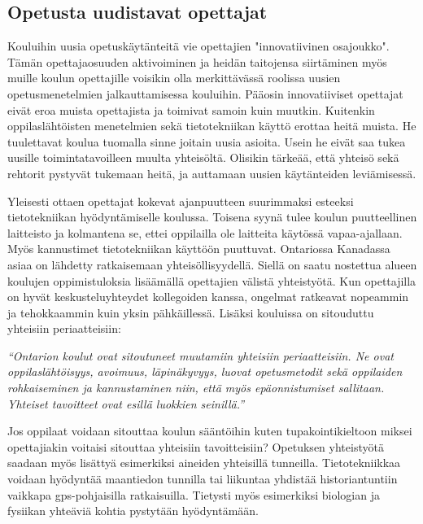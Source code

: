 \documentclass[utf8,bachelor]{gradu3}
\begin{document}
\subsection{Opetusta uudistavat opettajat}
Kouluihin uusia opetuskäytänteitä vie opettajien "innovatiivinen osajoukko". Tämän opettajaosuuden aktivoiminen ja heidän taitojensa siirtäminen myös muille koulun opettajille voisikin olla merkittävässä roolissa uusien opetusmenetelmien jalkauttamisessa kouluihin. Pääosin innovatiiviset opettajat eivät eroa muista opettajista ja toimivat samoin kuin muutkin. Kuitenkin oppilaslähtöisten menetelmien sekä tietotekniikan käyttö erottaa heitä muista. He tuulettavat koulua tuomalla sinne joitain uusia asioita. Usein he eivät saa tukea uusille toimintatavoilleen muulta yhteisöltä. Olisikin tärkeää, että yhteisö sekä rehtorit pystyvät tukemaan heitä, ja auttamaan uusien käytänteiden leviämisessä. \parencite[][]{koulunArki}

Yleisesti ottaen opettajat kokevat ajanpuutteen suurimmaksi esteeksi tietotekniikan hyödyntämiselle koulussa. Toisena syynä tulee koulun puutteellinen laitteisto ja kolmantena se, ettei oppilailla ole laitteita käytössä vapaa-ajallaan. \parencite[][]{sites} Myös kannustimet tietotekniikan käyttöön puuttuvat. \parencite[][]{itviikkoWilen} Ontariossa Kanadassa asiaa on lähdetty ratkaisemaan yhteisöllisyydellä.
Siellä on saatu nostettua alueen koulujen oppimistuloksia lisäämällä opettajien välistä yhteistyötä. Kun opettajilla on hyvät keskusteluyhteydet kollegoiden kanssa, ongelmat ratkeavat nopeammin ja tehokkaammin kuin yksin pähkäillessä. Lisäksi kouluissa on sitouduttu yhteisiin periaatteisiin:

\textit{“Ontarion koulut ovat sitoutuneet muutamiin yhteisiin periaatteisiin. Ne ovat oppilaslähtöisyys, avoimuus, läpinäkyvyys, luovat opetusmetodit sekä oppilaiden rohkaiseminen ja kannustaminen niin, että myös epäonnistumiset sallitaan. Yhteiset tavoitteet ovat esillä luokkien seinillä.”} \parencite[][]{KanadanMalli}

Jos oppilaat voidaan sitouttaa koulun sääntöihin kuten tupakointikieltoon miksei opettajiakin voitaisi sitouttaa yhteisiin tavoitteisiin? Opetuksen yhteistyötä saadaan myös lisättyä esimerkiksi aineiden yhteisillä tunneilla. Tietotekniikkaa voidaan hyödyntää maantiedon tunnilla tai liikuntaa yhdistää historiantuntiin vaikkapa gps-pohjaisilla ratkaisuilla. \parencite[][]{heijoe} Tietysti myös esimerkiksi biologian ja fysiikan yhteäviä kohtia pystytään hyödyntämään. 
\end{document}
